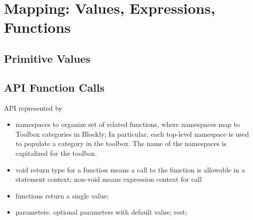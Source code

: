 


\section{Mapping: Values, Expressions, Functions}

\subsection{Primitive Values}



\subsection{API Function Calls}

API represented by
\begin{itemize}
  \item namespaces to organize set of related functions, 
       where namespaces map to Toolbox categories in Blockly;
       In particular, each top-level namespace is used to populate a category 
       in the toolbox. The name of the namespaces is capitalized for the toolbox. 

  \item void return type for a function means a call to the function is allowable in
      a statement context; non-void means expression context for call
  \item functions return a single value;
  \item parameters: optional parameters with default value; rest; 
\end{itemize}




